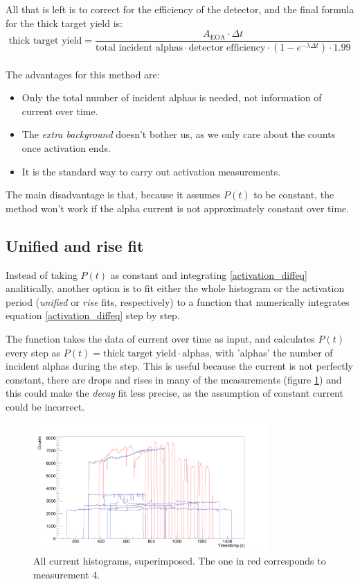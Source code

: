\documentclass[a4paper,12pt]{report}
\begin{document}
All that is left is to correct for the efficiency of the detector, and the final formula for the thick target yield is:
\begin{equation}
	\text{thick target yield} = \frac{A_\text{EOA}\cdot\Delta t}{\text{total incident alphas} \cdot \text{detector efficiency} \cdot \left(1 - e^{-\lambda \Delta t} \right) \cdot 1.99}	%
\end{equation}
\\

The advantages for this method are:
\begin{itemize}
	\item Only the total number of incident alphas is needed, not information of current over time.
	\item The \textit{extra background} doesn't bother us, as we only care about the counts once activation ends.
	\item It is the standard way to carry out activation measurements.
\end{itemize}
The main disadvantage is that, because it assumes $P(t)$ to be constant, the method won't work if the alpha current is not approximately constant over time.

\subsection{Unified and rise fit}
Instead of taking $P(t)$ as constant and integrating \ref{activation_diffeq} analitically, another option is to fit either the whole histogram or the activation period (\textit{unified} or \textit{rise} fits, respectively) to a function that numerically integrates equation \ref{activation_diffeq} step by step.

The function takes the data of current over time as input, and calculates $P(t)$ every step as $P(t) = \text{thick target yield}\cdot\text{alphas}$, with 'alphas' the number of incident alphas during the step.
This is useful because the current is not perfectly constant, there are drops and rises in many of the measurements (figure \ref{current_histograms}) and this could make the \textit{decay} fit less precise, as the assumption of constant current could be incorrect.
\\
\begin{figure}[H]
	\centering
	\includegraphics[width=0.80\textwidth]{current_histograms.png}
	\caption{All current histograms, superimposed.
	The one in red corresponds to measurement 4.}
	\label{current_histograms}
\end{figure}
\end{document}
